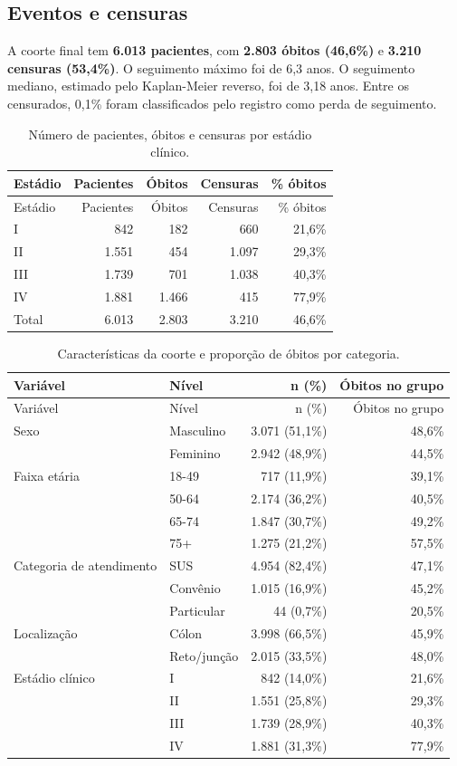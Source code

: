 \documentclass[
  brazilian,
]{article}
\begin{document}
\subsection{Eventos e censuras}\label{eventos-e-censuras}

A coorte final tem \textbf{6.013 pacientes}, com \textbf{2.803 óbitos
(46,6\%)} e \textbf{3.210 censuras (53,4\%)}. O seguimento máximo foi de
6,3 anos. O seguimento mediano, estimado pelo Kaplan-Meier reverso, foi
de 3,18 anos. Entre os censurados, 0,1\% foram classificados pelo
registro como perda de seguimento.

\begin{longtable}[]{@{}lrrrr@{}}
\caption{Número de pacientes, óbitos e censuras por estádio
clínico.}\tabularnewline
\toprule\noalign{}
Estádio & Pacientes & Óbitos & Censuras & \% óbitos \\
\midrule\noalign{}
\endfirsthead
\toprule\noalign{}
Estádio & Pacientes & Óbitos & Censuras & \% óbitos \\
\midrule\noalign{}
\endhead
\bottomrule\noalign{}
\endlastfoot
I & 842 & 182 & 660 & 21,6\% \\
II & 1.551 & 454 & 1.097 & 29,3\% \\
III & 1.739 & 701 & 1.038 & 40,3\% \\
IV & 1.881 & 1.466 & 415 & 77,9\% \\
Total & 6.013 & 2.803 & 3.210 & 46,6\% \\
\end{longtable}

\begin{longtable}[]{@{}llrr@{}}
\caption{Características da coorte e proporção de óbitos por
categoria.}\tabularnewline
\toprule\noalign{}
Variável & Nível & n (\%) & Óbitos no grupo \\
\midrule\noalign{}
\endfirsthead
\toprule\noalign{}
Variável & Nível & n (\%) & Óbitos no grupo \\
\midrule\noalign{}
\endhead
\bottomrule\noalign{}
\endlastfoot
Sexo & Masculino & 3.071 (51,1\%) & 48,6\% \\
& Feminino & 2.942 (48,9\%) & 44,5\% \\
Faixa etária & 18-49 & 717 (11,9\%) & 39,1\% \\
& 50-64 & 2.174 (36,2\%) & 40,5\% \\
& 65-74 & 1.847 (30,7\%) & 49,2\% \\
& 75+ & 1.275 (21,2\%) & 57,5\% \\
Categoria de atendimento & SUS & 4.954 (82,4\%) & 47,1\% \\
& Convênio & 1.015 (16,9\%) & 45,2\% \\
& Particular & 44 (0,7\%) & 20,5\% \\
Localização & Cólon & 3.998 (66,5\%) & 45,9\% \\
& Reto/junção & 2.015 (33,5\%) & 48,0\% \\
Estádio clínico & I & 842 (14,0\%) & 21,6\% \\
& II & 1.551 (25,8\%) & 29,3\% \\
& III & 1.739 (28,9\%) & 40,3\% \\
& IV & 1.881 (31,3\%) & 77,9\% \\
\end{longtable}
\end{document}
